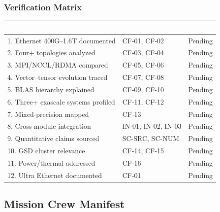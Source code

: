 \documentclass[11pt,letterpaper]{article}
\newcommand{\tableheader}[1]{\textbf{\sffamily\textcolor{white}{#1}}}
\begin{document}
\subsubsection{Verification Matrix}

\begin{center}
\begin{tabularx}{\textwidth}{XL{3cm}C{1.5cm}}
\toprule
{}
\tableheader{Success Criterion} & \tableheader{Test ID(s)} & \tableheader{Status} \\
. Ethernet 400G--1.6T documented & CF-01, CF-02 & Pending \\
2. Four+ topologies analyzed & CF-03, CF-04 & Pending \\
3. MPI/NCCL/RDMA compared & CF-05, CF-06 & Pending \\
4. Vector--tensor evolution traced & CF-07, CF-08 & Pending \\
5. BLAS hierarchy explained & CF-09, CF-10 & Pending \\
6. Three+ exascale systems profiled & CF-11, CF-12 & Pending \\
7. Mixed-precision mapped & CF-13 & Pending \\
8. Cross-module integration & IN-01, IN-02, IN-03 & Pending \\
9. Quantitative claims sourced & SC-SRC, SC-NUM & Pending \\
10. GSD cluster relevance & CF-14, CF-15 & Pending \\
11. Power/thermal addressed & CF-16 & Pending \\
12. Ultra Ethernet documented & CF-01 & Pending \\
\bottomrule
\end{tabularx}
\end{center}

\subsection{Mission Crew Manifest}
\end{document}
